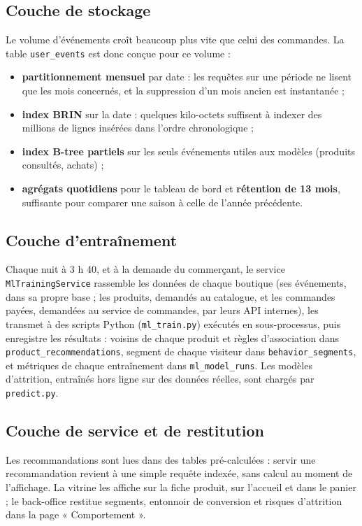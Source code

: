 \subsection{Couche de stockage}
Le volume d'événements croît beaucoup plus vite que celui des commandes. La table \texttt{user\_events} est donc conçue pour ce volume :
\begin{itemize}
  \item \textbf{partitionnement mensuel} par date : les requêtes sur une période ne lisent que les mois concernés, et la suppression d'un mois ancien est instantanée ;
  \item \textbf{index BRIN} sur la date : quelques kilo-octets suffisent à indexer des millions de lignes insérées dans l'ordre chronologique ;
  \item \textbf{index B-tree partiels} sur les seuls événements utiles aux modèles (produits consultés, achats) ;
  \item \textbf{agrégats quotidiens} pour le tableau de bord et \textbf{rétention de 13 mois}, suffisante pour comparer une saison à celle de l'année précédente.
\end{itemize}

\subsection{Couche d'entraînement}
Chaque nuit à 3 h 40, et à la demande du commerçant, le service \texttt{MlTrainingService} rassemble les données de chaque boutique (ses événements, dans sa propre base ; les produits, demandés au catalogue, et les commandes payées, demandées au service de commandes, par leurs API internes), les transmet à des scripts Python (\texttt{ml\_train.py}) exécutés en sous-processus, puis enregistre les résultats : voisins de chaque produit et règles d'association dans \texttt{product\_recommendations}, segment de chaque visiteur dans \texttt{behavior\_segments}, et métriques de chaque entraînement dans \texttt{ml\_model\_runs}. Les modèles d'attrition, entraînés hors ligne sur des données réelles, sont chargés par \texttt{predict.py}.

\subsection{Couche de service et de restitution}
Les recommandations sont lues dans des tables pré-calculées : servir une recommandation revient à une simple requête indexée, sans calcul au moment de l'affichage. La vitrine les affiche sur la fiche produit, sur l'accueil et dans le panier ; le back-office restitue segments, entonnoir de conversion et risques d'attrition dans la page « Comportement ».

